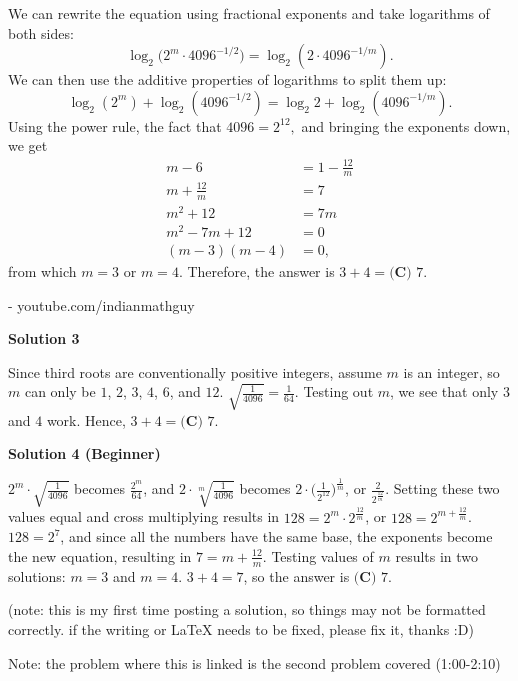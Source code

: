 \begin{enumerate}
We can rewrite the equation using fractional exponents and take logarithms of both sides: 
 \[\log_2{(2^{m}\cdot4096^{-1/2}}) = \log_2{(2\cdot4096^{-1/m})}.\] We can then use the additive properties of logarithms to split them up: 
 \[\log_2{(2^{m})} + \log_2{(4096^{-1/2})} = \log_2{2} + \log_2{(4096^{-1/m})}.\] Using the power rule, the fact that $4096 = 2^{12},$ and bringing the exponents down, we get
 \begin{align*} m - 6 &= 1 - \frac{12}{m} \\ m + \frac{12}{m} &= 7 \\ m^{2} + 12 &= 7m \\ m^{2} - 7m + 12 &= 0 \\ (m-3)(m-4) &= 0, \end{align*}
from which $m = 3$ or $m = 4$. Therefore, the answer is $3+4 = \boxed{\textbf{(C) } 7}.$

 - youtube.com/indianmathguy

 



\textbf{Solution 3}

Since third roots are conventionally positive integers, assume $m$ is an integer, so $m$ can only be $1$, $2$, $3$, $4$, $6$, and $12$. $\sqrt{\frac{1}{4096}}=\frac{1}{64}$. Testing out $m$, we see that only $3$ and $4$ work. Hence, $3+4=\boxed{\textbf{(C) }7}$.

 


 



\textbf{Solution 4 (Beginner)}

$2^m \cdot \sqrt{\frac{1}{4096}}$ becomes $\frac{2^m}{64}$, and $2 \cdot \sqrt[m]{\frac{1}{4096}}$ becomes $2 \cdot {(\frac{1}{2^{12}}})^{\frac{1}{m}}$, or $\frac{2}{2^{\frac{12}{m}}}$. Setting these two values equal and cross multiplying results in $128=2^m \cdot 2^{\frac{12}{m}}$, or $128=2^{m+\frac{12}{m}}$. $128=2^7$, and since all the numbers have the same base, the exponents become the new equation, resulting in $7=m+\frac{12}{m}$. Testing values of $m$ results in two solutions: $m=3$ and $m=4$. $3+4=7$, so the answer is $\boxed{\textbf{(C) }7}.$

 (note: this is my first time posting a solution, so things may not be formatted correctly. if the writing or LaTeX needs to be fixed, please fix it, thanks :D)

 Note: the problem where this is linked is the second problem covered (1:00-2:10)

 



\end{enumerate}
